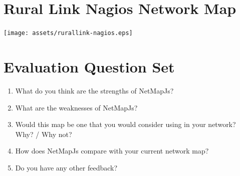 \documentclass[11pt, a4paper]{article}
\begin{document}
\newpage

\section{Rural Link Nagios Network Map}
\label{app:crcnetnagios}
\centering
\texttt{[image: assets/rurallink-nagios.eps]}

\newpage

\section{Evaluation Question Set}

\begin{enumerate}
\item What do you think are the strengths of NetMapJs?
\item What are the weaknesses of NetMapJs?
\item Would this map be one that you would consider using in your network? Why? / Why not?
\item How does NetMapJs compare with your current network map?
\item Do you have any other feedback?
\end{enumerate}
\end{document}
